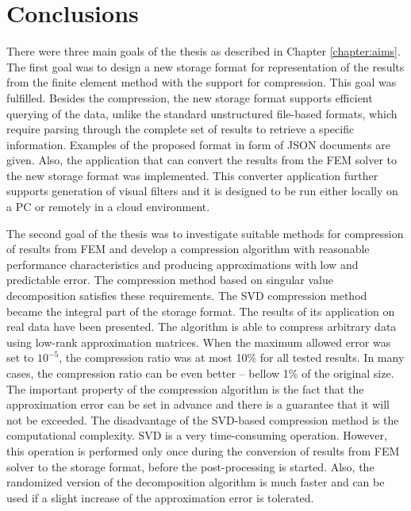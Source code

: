 \chapter{Conclusions}

There were three main goals of the thesis as described in Chapter \ref{chapter:aims}. The first goal was to design a new storage format for representation of the results from the finite element method with the support for compression. This goal was fulfilled. Besides the compression, the new storage format supports efficient querying of the data, unlike the standard unstructured file-based formats, which require parsing through the complete set of results to retrieve a specific information. Examples of the proposed format in form of JSON documents are given. Also, the application that can convert the results from the FEM solver to the new storage format was implemented. This converter application further supports generation of visual filters and it is designed to be run either locally on a PC or remotely in a cloud environment.

The second goal of the thesis was to investigate suitable methods for compression of results from FEM and develop a compression algorithm with reasonable performance characteristics and producing approximations with low and predictable error. The compression method based on singular value decomposition satisfies these requirements. The SVD compression method became the integral part of the storage format. The results of its application on real data have been presented. The algorithm is able to compress arbitrary data using low-rank approximation matrices. When the maximum allowed error was set to $10^{-5}$, the compression ratio was at most 10\% for all tested results. In many cases, the compression ratio can be even better -- bellow 1\% of the original size. The important property of the compression algorithm is the fact that the approximation error can be set in advance and there is a guarantee that it will not be exceeded. The disadvantage of the SVD-based compression method is the computational complexity. SVD is a very time-consuming operation. However, this operation is performed only once during the conversion of results from FEM solver to the storage format, before the post-processing is started. Also, the randomized version of the decomposition algorithm is much faster and can be used if a slight increase of the approximation error is tolerated.

